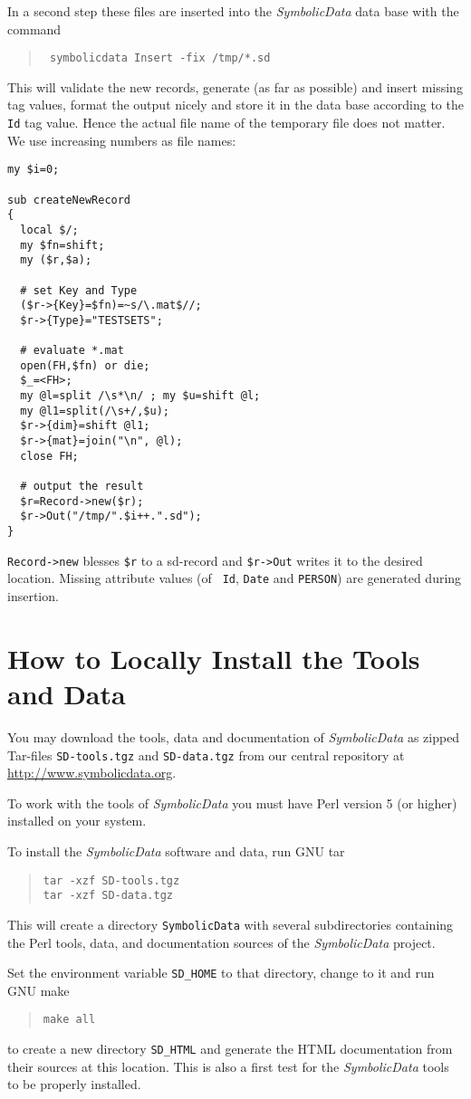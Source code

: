 \documentclass[11pt]{article}
\newcommand{\SD}{{\em Symbo\-lic\-Data}}
\begin{document}
In a second step these files are inserted into the {\SD} data base with
the command
\begin{quote}\tt
symbolicdata Insert -fix /tmp/*.sd
\end{quote}
This will validate the new records, generate (as far as possible) and
insert missing tag values, format the output nicely and store it in
the data base according to the {\tt Id} tag value.  Hence the actual
file name of the temporary file does not matter.  We use increasing
numbers as file names: 
{\small\begin{verbatim} 
my $i=0;

sub createNewRecord
{
  local $/;
  my $fn=shift;
  my ($r,$a); 

  # set Key and Type	
  ($r->{Key}=$fn)=~s/\.mat$//;
  $r->{Type}="TESTSETS";

  # evaluate *.mat
  open(FH,$fn) or die;
  $_=<FH>;
  my @l=split /\s*\n/ ; my $u=shift @l;
  my @l1=split(/\s+/,$u);
  $r->{dim}=shift @l1;
  $r->{mat}=join("\n", @l);
  close FH;

  # output the result
  $r=Record->new($r); 
  $r->Out("/tmp/".$i++.".sd"); 
}
\end{verbatim}}
{\tt Record->new} blesses {\tt \$r} to a sd-record and {\tt \$r->Out}
writes it to the desired location. Missing attribute values (of {\tt
Id}, {\tt Date} and {\tt PERSON}) are generated during insertion.

\section{How to Locally Install the Tools and Data}

You may download the tools, data and documentation of {\SD} as zipped
Tar-files {\tt SD-tools.tgz} and {\tt SD-data.tgz} from our central
repository at \url{http://www.symbolicdata.org}.

To work with the tools of {\SD} you must have Perl version 5 (or
higher) installed on your system.

To install the {\SD} software and data, run GNU tar 
\begin{quote}\tt tar -xzf SD-tools.tgz \\ tar -xzf SD-data.tgz 
\end{quote}

This will create a directory {\tt SymbolicData} with several
subdirectories containing the Perl tools, data, and documentation
sources of the {\SD} project.

Set the environment variable \verb?SD_HOME? to that directory,
change to it and run GNU make
\begin{quote}\tt  make all \end{quote}
to create a new directory {\tt SD\_HTML} and generate the HTML
documentation from their sources at this location. This is also a
first test for the {\SD} tools to be properly installed.
\end{document}
